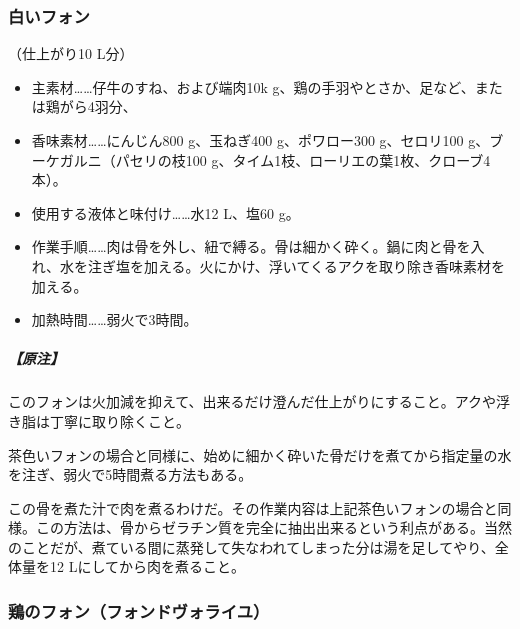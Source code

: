 \begin{recette}
\hypertarget{fonds-blanc}{%
\subsubsection{白いフォン}\label{fonds-blanc}}



（仕上がり10 L分）

\begin{itemize}
\item
  主素材\ldots{}\ldots{}仔牛のすね、および端肉10k
  g、鶏の手羽やとさか、足など、または鶏がら4羽分、
\item
  香味素材\ldots{}\ldots{}にんじん800 g、玉ねぎ400 g、ポワロー300
  g、セロリ100 g、ブーケガルニ（パセリの枝100
  g、タイム1枝、ローリエの葉1枚、クローブ4本）。
\item
  使用する液体と味付け\ldots{}\ldots{}水12 L、塩60 g。
\item
  作業手順\ldots{}\ldots{}肉は骨を外し、紐で縛る。骨は細かく砕く。鍋に肉と骨を入れ、水を注ぎ塩を加える。火にかけ、浮いてくるアクを取り除き香味素材を加える。
\item
  加熱時間\ldots{}\ldots{}弱火で3時間。
\end{itemize}

\hypertarget{nota-fonds-blanc}{%
\subparagraph{【原注】}\label{nota-fonds-blanc}}

このフォンは火加減を抑えて、出来るだけ澄んだ仕上がりにすること。アクや浮き脂は丁寧に取り除くこと。

茶色いフォンの場合と同様に、始めに細かく砕いた骨だけを煮てから指定量の水を注ぎ、弱火で5時間煮る方法もある。

この骨を煮た汁で肉を煮るわけだ。その作業内容は上記茶色いフォンの場合と同様。この方法は、骨からゼラチン質を完全に抽出出来るという利点がある。当然のことだが、煮ている間に蒸発して失なわれてしまった分は湯を足してやり、全体量を12
Lにしてから肉を煮ること。

\hypertarget{fonds-de-volaille}{%
\subsubsection{鶏のフォン（フォンドヴォライユ）}\label{fonds-de-volaille}}




\end{recette}
